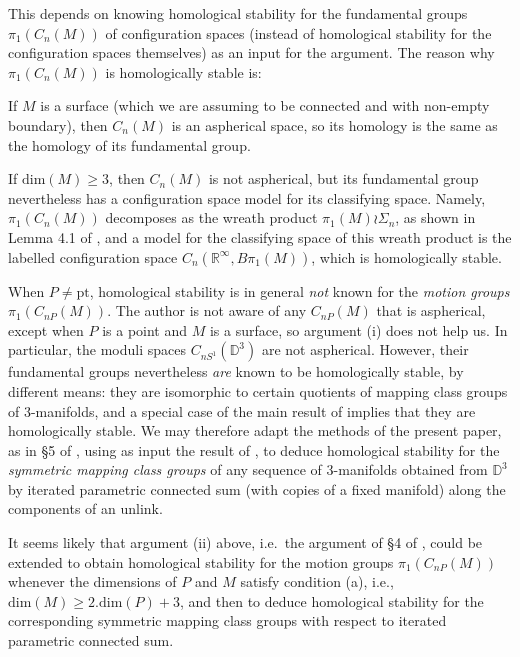 \documentclass[reqno,a4paper]{article}
\numberwithin{equation}{section}
\theoremstyle{italicised}
\theoremstyle{upright}
\theoremstyle{italicised-restate}
\newenvironment{itemizeb}%
{\begin{compactitem}
\renewcommand{\labelitemi}{\ensuremath{\bullet}}
\renewcommand{\labelitemii}{\ensuremath{\bullet}}}%
{\end{compactitem}}
\newcommand{\bD}{\mathbb{D}}
\newcommand{\bR}{\mathbb{R}}
\renewcommand{\geq}{\geqslant}
\begin{document}
This depends on knowing homological stability for the fundamental groups $\pi_1(C_n(M))$ of configuration spaces (instead of homological stability for the configuration spaces themselves) as an input for the argument. The reason why $\pi_1(C_n(M))$ is homologically stable is:
\begin{itemizeb}
\item[(i)] If $M$ is a surface (which we are assuming to be connected and with non-empty boundary), then $C_n(M)$ is an aspherical space, so its homology is the same as the homology of its fundamental group.
\item[(ii)] If $\mathrm{dim}(M) \geq 3$, then $C_n(M)$ is not aspherical, but its fundamental group nevertheless has a configuration space model for its classifying space. Namely, $\pi_1(C_n(M))$ decomposes as the wreath product $\pi_1(M) \wr \Sigma_n$, as shown in Lemma 4.1 of \cite{Tillmann2016Homologystabilitysymmetric}, and a model for the classifying space of this wreath product is the labelled configuration space $C_n(\bR^\infty,B\pi_1(M))$, which is homologically stable.
\end{itemizeb}

When $P \neq \mathrm{pt}$, homological stability is in general \emph{not} known for the \emph{motion groups} $\pi_1(C_{nP}(M))$. The author is not aware of any $C_{nP}(M)$ that is aspherical, except when $P$ is a point and $M$ is a surface, so argument (i) does not help us. In particular, the moduli spaces $C_{nS^1}(\bD^3)$ are not aspherical. However, their fundamental groups nevertheless \emph{are} known to be homologically stable, by different means: they are isomorphic to certain quotients of mapping class groups of $3$-manifolds, and a special case of the main result of \cite{HatcherWahl2010Stabilizationmappingclass} implies that they are homologically stable. We may therefore adapt the methods of the present paper, as in \S 5 of \cite{Tillmann2016Homologystabilitysymmetric}, using as input the result of \cite{HatcherWahl2010Stabilizationmappingclass}, to deduce homological stability for the \emph{symmetric mapping class groups} of any sequence of $3$-manifolds obtained from $\bD^3$ by iterated parametric connected sum (with copies of a fixed manifold) along the components of an unlink.

It seems likely that argument (ii) above, i.e.\ the argument of \S 4 of \cite{Tillmann2016Homologystabilitysymmetric}, could be extended to obtain homological stability for the motion groups $\pi_1(C_{nP}(M))$ whenever the dimensions of $P$ and $M$ satisfy condition (a), i.e., $\mathrm{dim}(M) \geq 2.\mathrm{dim}(P) + 3$, and then to deduce homological stability for the corresponding symmetric mapping class groups with respect to iterated parametric connected sum.
\end{document}
